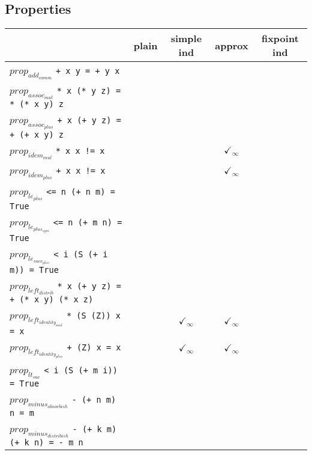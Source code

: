 \documentclass{article}
\begin{document}
\subsection*{Properties}
\begin{longtable}{p{10cm} || c | c | c | c | }
  & plain & simple ind & approx & fixpoint ind \\
\hline
$prop_{add_{comm}}$ \newline \verb`+ x y = + y x` &  &  &  &  \\
\hline
$prop_{assoc_{mul}}$ \newline \verb`* x (* y z) = * (* x y) z` &  &  &  &  \\
\hline
$prop_{assoc_{plus}}$ \newline \verb`+ x (+ y z) = + (+ x y) z` &  &  &  &  \\
\hline
$prop_{idem_{mul}}$ \newline \verb`* x x != x` &  &  & $\checkmark_{\infty}$ &  \\
\hline
$prop_{idem_{plus}}$ \newline \verb`+ x x != x` &  &  & $\checkmark_{\infty}$ &  \\
\hline
$prop_{le_{plus}}$ \newline \verb`<= n (+ n m) = True` &  &  &  &  \\
\hline
$prop_{le_{plus_{sym}}}$ \newline \verb`<= n (+ m n) = True` &  &  &  &  \\
\hline
$prop_{le_{succ_{plus}}}$ \newline \verb`< i (S (+ i m)) = True` &  &  &  &  \\
\hline
$prop_{left_{distrib}}$ \newline \verb`* x (+ y z) = + (* x y) (* x z)` &  &  &  &  \\
\hline
$prop_{left_{identity_{mul}}}$ \newline \verb`* (S (Z)) x = x` &  & $\checkmark_{\infty}$ & $\checkmark_{\infty}$ &  \\
\hline
$prop_{left_{identity_{plus}}}$ \newline \verb`+ (Z) x = x` &  & $\checkmark_{\infty}$ & $\checkmark_{\infty}$ &  \\
\hline
$prop_{lt_{suc}}$ \newline \verb`< i (S (+ m i)) = True` &  &  &  &  \\
\hline
$prop_{minus_{absorbish}}$ \newline \verb`- (+ n m) n = m` &  &  &  &  \\
\hline
$prop_{minus_{distribish}}$ \newline \verb`- (+ k m) (+ k n) = - m n` &  &  &  &  \\

\end{longtable}
\end{document}
